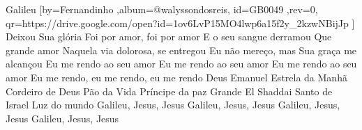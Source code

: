 \beginsong
{Galileu %
}[by={Fernandinho %
},album={@walyssondosreis},
id={GB0049 %
},rev={0}, %
qr={https://drive.google.com/open?id=1ov6LvP15MO4lwp6a15f2y_2kzwNBijJp %
}]
\beginverse*
Deixou Sua glória
Foi por amor, foi por amor
E o seu sangue derramou
Que grande amor
\endverse
\beginverse*
Naquela via dolorosa, se entregou
Eu não mereço, mas Sua graça me alcançou
\endverse
\beginverse*
Eu me rendo ao seu amor
Eu me rendo ao seu amor
Eu me rendo ao seu amor
Eu me rendo, eu me rendo, eu me rendo
\endverse
\beginverse*
Deus Emanuel
Estrela da Manhã
Cordeiro de Deus
Pão da Vida
Príncipe da paz
Grande El Shaddai
Santo de Israel
Luz do mundo
\endverse
\beginchorus
Galileu, Jesus, Jesus
Galileu, Jesus, Jesus
Galileu, Jesus, Jesus
Galileu, Jesus, Jesus
\endchorus

\begin{comment}
\lstset{basicstyle=\scriptsize\bf} %
\tab{Solo 1}
\begin{lstlisting}
E|-----------------------------------------------------|
B|-----------------------------------------------------|
G|-----------------------------------------------------|
D|-----------------------------------------------------|
A|-----------------------------------------------------|
E|-----------------------------------------------------|
\end{lstlisting}
\end{comment}
 
